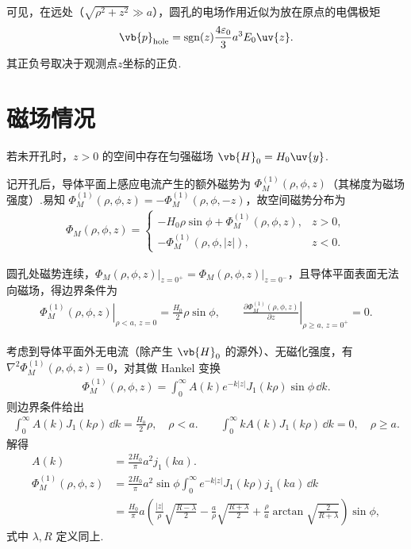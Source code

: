 可见，在远处（\(\sqrt{\rho^2+z^2} \gg a\)），圆孔的电场作用近似为放在原点的电偶极矩
\begin{align*}
	\vb{p}_{\text{hole}} = \operatorname{sgn}(z) \frac{4\varepsilon_0}{3} a^3 E_0 \uv{z}.
\end{align*}
其正负号取决于观测点\(z\)坐标的正负.

\section{磁场情况}
若未开孔时，\(z > 0\) 的空间中存在匀强磁场 \(\vb{H}_0 = H_0 \uv{y}\).

记开孔后，导体平面上感应电流产生的额外磁势为 \(\Phi_M^{(1)}(\rho, \phi, z)\)（其梯度为磁场强度）.易知 \(\Phi_M^{(1)}(\rho, \phi, z) = -\Phi_M^{(1)}(\rho, \phi, -z)\)，故空间磁势分布为
\begin{align*}
	\Phi_M(\rho, \phi, z) =
	\begin{cases}
		-H_0 \rho \sin\phi + \Phi_M^{(1)}(\rho, \phi, z), & z > 0, \\[4pt]
		-\Phi_M^{(1)}(\rho, \phi, |z|),                   & z < 0.
	\end{cases}
\end{align*}

圆孔处磁势连续，\(\left.\Phi_M(\rho, \phi, z)\right|_{z=0^+} = \left.\Phi_M(\rho, \phi, z)\right|_{z=0^-}\)，且导体平面表面无法向磁场，得边界条件为
\begin{align*}
	\left.\Phi_M^{(1)}(\rho, \phi, z)\right|_{\rho < a,\, z=0} = \frac{H_0}{2} \rho \sin\phi, \qquad
	\left.\frac{\partial \Phi_M^{(1)}(\rho, \phi, z)}{\partial z}\right|_{\rho \ge a,\, z=0^+} = 0.
\end{align*}

考虑到导体平面外无电流（除产生 \(\vb{H}_0\) 的源外）、无磁化强度，有\(\nabla^2 \Phi_M^{(1)}(\rho, \phi, z) = 0\)，对其做 Hankel 变换
\begin{align*}
	\Phi_M^{(1)}(\rho, \phi, z) = \int_0^\infty A(k) e^{-k|z|} J_1(k\rho) \sin\phi \,\dd k.
\end{align*}
则边界条件给出
\begin{align*}
	\int_0^\infty A(k) J_1(k\rho) \,\dd k = \frac{H_0}{2} \rho, \quad \rho < a. \qquad
	\int_0^\infty k A(k) J_1(k\rho) \,\dd k = 0, \quad \rho \ge a.
\end{align*}
解得
\begin{align*}
	A(k) & = \frac{2H_0}{\pi} a^2 j_1(ka).                                                                                                                                                         \\
	\Phi_M^{(1)}(\rho, \phi, z)
	     & = \frac{2H_0}{\pi} a^2 \sin\phi \int_0^\infty e^{-k|z|} J_1(k\rho) j_1(ka) \,\dd k                                                                                                       \\
	     & = \frac{H_0}{\pi} a \left( \frac{|z|}{\rho} \sqrt{\frac{R-\lambda}{2}} - \frac{a}{\rho} \sqrt{\frac{R+\lambda}{2}} + \frac{\rho}{a} \arctan\sqrt{\frac{2}{R+\lambda}} \right) \sin\phi,
\end{align*}
式中 \(\lambda, R\) 定义同上.

